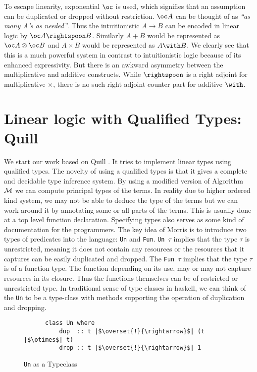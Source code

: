 To escape linearity, exponential $\oc$ is used, which signifies that an assumption can
be duplicated or dropped without restriction. $\oc A$ can be thought of as {\em``as many A's as needed''}.
Thus the intuitionistic $A \rightarrow B$ can be encoded in linear logic by $\oc A \rightspoon B$.
Similarly $A \plus B$ would be represented as $\oc A \otimes \oc B$ and $A \times B$ would be represented as $A \with B$.
We clearly see that this is a much powerful system in contrast to intuitionistic logic because of its enhanced expressivity.
But there is an awkward asymmetry between the multiplicative and additive constructs. While $\rightspoon$ is a right adjoint
for multiplicative $\times$, there is no such right adjoint counter part for additive $\with$.
\section{Linear logic with Qualified Types: Quill}
We start our work based on Quill \citep{morris_best_2016}. It tries
to implement linear types using qualified types. The novelty of using a qualified
types is that it gives a complete and decidable type inference system. By using
a modified version of Algorithm $\mathcal{M}$ we can compute principal types of the terms.
In reality due to higher ordered kind system, we may not be able to deduce the
type of the terms but we can work around it by annotating some or all parts of
the terms. This is usually done at a top level function declaration. Specifying types
also serves as some kind of documentation for the programmers.
The key idea of Morris is to introduce two types of predicates into the language: \texttt{Un} and \texttt{Fun}.
\texttt{Un $\tau$} implies that the type $\tau$ is unrestricted, meaning it does not
contain any resources or the resources that it captures can be easily duplicated and dropped.
The \texttt{Fun $\tau$} implies that the type $\tau$ is of a function type. The function
depending on its use, may or may not capture resources in its closure. Thus the functions
themselves can be of restricted or unrestricted type. In traditional sense of type classes
in haskell, we can think of the \texttt{Un} to be a type-class with methods supporting the operation
of duplication and dropping.
\begin{figure}[h]
  \centering
  \begin{framed}
    \begin{verbatim}
      class Un where
          dup  :: t |$\overset{!}{\rightarrow}$| (t |$\otimes$| t)
          drop :: t |$\overset{!}{\rightarrow}$| 1
    \end{verbatim}
  \end{framed}
  \caption{\texttt{Un} as a Typeclass}
  \label{fig:un-typeclass}
\end{figure}

